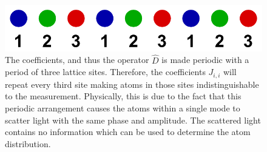 \begin{figure}[htbp!]
  \centering
  \includegraphics[width=1.0\textwidth]{1DModes}
  \caption[1D Modes due to Measurement Backaction]{The coefficients,
    and thus the operator $\hat{D}$ is made periodic with a period of
    three lattice sites. Therefore, the coefficients $J_{i,i}$ will
    repeat every third site making atoms in those sites
    indistinguishable to the measurement. Physically, this is due to
    the fact that this periodic arrangement causes the atoms within a
    single mode to scatter light with the same phase and amplitude.
    The scattered light contains no information which can be used to
    determine the atom distribution.}
  \label{fig:1dmodes}
\end{figure}

